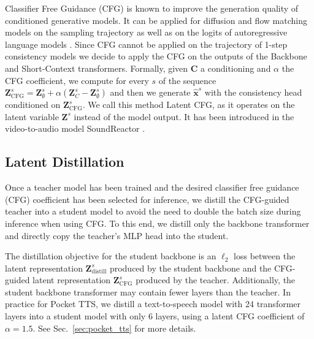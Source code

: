 Classifier Free Guidance (CFG) \citep{cfg} is known to improve the generation quality of conditioned generative models. It can be applied for diffusion and flow matching models on the sampling trajectory as well as on the logits of autoregressive language models \citep{audiogen}. Since CFG cannot be applied on the trajectory of 1-step consistency models we decide to apply the CFG on the outputs of the Backbone and Short-Context transformers. Formally, given $\mathbf{C}$ a conditioning and $\alpha$ the CFG coefficient, we compute for every $s$ of the sequence $\mathbf{Z}^s_{\text{CFG}} =\mathbf{Z}^s_{\emptyset} + \alpha(\mathbf{Z}^s_{C} - \mathbf{Z}^s_{\emptyset})$ and then we generate $\hat{\mathbf{x}}^s$ with the consistency head conditioned on $\mathbf{Z}^s_{\text{CFG}}$. We call this method Latent CFG, as it operates on the latent variable $\mathbf{Z}^s$ instead of the model output. It has been introduced in the video-to-audio model SoundReactor \citep{soundreactor}.


\subsection{Latent Distillation}
Once a teacher model has been trained and the desired classifier free guidance (CFG) coefficient has been selected for inference, we distill the CFG-guided teacher into a student model to avoid the need to double the batch size during inference when using CFG. To this end, we distill only the backbone transformer and directly copy the teacher’s MLP head into the student. 

The distillation objective for the student backbone is an $\ell_2$ loss between the latent representation $\mathbf{Z}^s_{\text{distill}}$ produced by the student backbone and the CFG-guided latent representation $\mathbf{Z}^s_{\text{CFG}}$ produced by the teacher. Additionally, the student backbone transformer may contain fewer layers than the teacher. 
In practice for Pocket TTS, we distill a text-to-speech model with 24 transformer layers into a student model with only 6 layers, using a latent CFG coefficient of $\alpha = 1.5$. See Sec.~\ref{sec:pocket_tts} for more details. 


